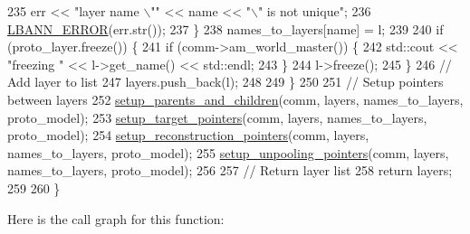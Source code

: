 \begin{DoxyCode}
235       err << \textcolor{stringliteral}{"layer name \(\backslash\)""} << name << \textcolor{stringliteral}{"\(\backslash\)" is not unique"};
236       \hyperlink{base_8hpp_a80b1d707117e968a6951b7222e4b2b87}{LBANN\_ERROR}(err.str());
237     \}
238     names\_to\_layers[name] = l;
239 
240     \textcolor{keywordflow}{if} (proto\_layer.freeze()) \{
241       \textcolor{keywordflow}{if} (comm->am\_world\_master()) \{
242         std::cout << \textcolor{stringliteral}{"freezing "} << l->get\_name() << std::endl;
243       \}
244       l->freeze();
245     \}
246     \textcolor{comment}{// Add layer to list}
247     layers.push\_back(l);
248 
249   \}
250 
251   \textcolor{comment}{// Setup pointers between layers}
252   \hyperlink{namespacelbann_1_1proto_1_1anonymous__namespace_02layer__graph__factory_8cpp_03_abbebb0b2e6ba1befb14b0b790eac96a0}{setup\_parents\_and\_children}(comm, layers, names\_to\_layers, proto\_model);
253   \hyperlink{namespacelbann_1_1proto_1_1anonymous__namespace_02layer__graph__factory_8cpp_03_a049fcca970d819d3c08bfdf71883de5c}{setup\_target\_pointers}(comm, layers, names\_to\_layers, proto\_model);
254   \hyperlink{namespacelbann_1_1proto_1_1anonymous__namespace_02layer__graph__factory_8cpp_03_ac0c3ac49d16d6926308c336149a2f039}{setup\_reconstruction\_pointers}(comm, layers, names\_to\_layers, proto\_model);
255   \hyperlink{namespacelbann_1_1proto_1_1anonymous__namespace_02layer__graph__factory_8cpp_03_a68f963a80592c01832cacf2acd4bacc1}{setup\_unpooling\_pointers}(comm, layers, names\_to\_layers, proto\_model);
256 
257   \textcolor{comment}{// Return layer list}
258   \textcolor{keywordflow}{return} layers;
259 
260 \}
\end{DoxyCode}
Here is the call graph for this function\+:\nopagebreak
